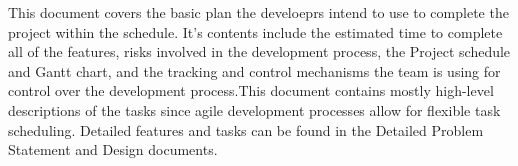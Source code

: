 This document covers the basic plan the develoeprs intend to use to complete the project within the schedule.  It's contents include the estimated time to complete all of the features, risks involved in the development process, the Project schedule and Gantt chart, and the tracking and control mechanisms the team is using for control over the development process.This document contains mostly high-level descriptions of the tasks since agile development processes allow for flexible task scheduling.  Detailed features and tasks can be found in the Detailed Problem Statement and Design documents.
